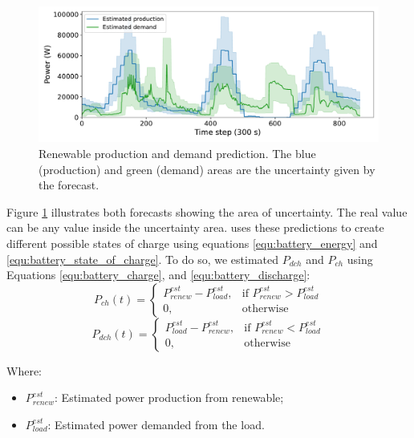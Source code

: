 \begin{figure}[!htb]
    \centering
    \includegraphics[scale=0.5]{Images/Heuristic/predictions.pdf}
    \caption[Renewable production and demand prediction.]{Renewable production and demand prediction. The blue (production) and green (demand) areas are the uncertainty given by the forecast.}
    \label{fig:predictions}
\end{figure}

Figure \ref{fig:predictions} illustrates both forecasts showing the area of uncertainty. The real value can be any value inside the uncertainty area. \emph{\systemName} uses these predictions to create different possible states of charge using equations \ref{equ:battery_energy} and \ref{equ:battery_state_of_charge}. To do so, we estimated $P_{dch}$ and $P_{ch}$ using Equations \ref{equ:battery_charge}, and \ref{equ:battery_discharge}: 
\begin{equation}
    \label{equ:battery_charge}
    P_{ch}(t) = 
    \begin{cases}
        P_{renew}^{est} - P_{load}^{est},& \text{if } P_{renew}^{est} > P_{load}^{est} \\
        0,              & \text{otherwise}
    \end{cases}
\end{equation}
\begin{equation}
    \label{equ:battery_discharge}
    P_{dch}(t) = 
    \begin{cases}
        P_{load}^{est} - P_{renew}^{est},& \text{if } P_{renew}^{est} < P_{load}^{est} \\
        0,              & \text{otherwise}
    \end{cases}
\end{equation}

Where:
\begin{itemize}
    \item \(P_{renew}^{est}\): Estimated power production from renewable;
    \item \(P_{load}^{est}\): Estimated power demanded from the load.
\end{itemize}

